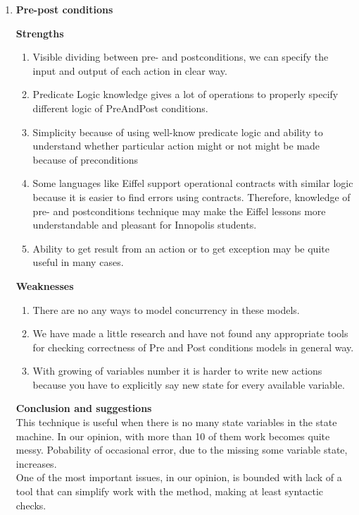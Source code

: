 \documentclass{article}
\begin{document}
\begin{enumerate}
\item \textbf{Pre-post conditions}

\textbf{Strengths}

\begin{enumerate}
\item Visible dividing between pre- and postconditions, we can specify the input and output of each action in clear way.
\item Predicate Logic knowledge gives a lot of operations to properly specify different logic of PreAndPost conditions.
\item Simplicity because of using well-know predicate logic and ability to understand whether particular action might or not might be made because of preconditions
\item Some languages like Eiffel support operational contracts with similar logic because it is easier to find errors using contracts. Therefore, knowledge of pre- and postconditions technique may make the Eiffel lessons more understandable and pleasant for Innopolis students.
\item Ability to get result from an action or to get exception may be quite useful in many cases.
\end{enumerate}

\textbf{Weaknesses}

\begin{enumerate}
\item There are no any ways to model concurrency in these models. 
\item We have made a little research and have not found any appropriate tools for checking correctness of Pre and Post conditions models in general way.
\item With growing of variables number it is harder to write new actions because you have to explicitly say new state for every available variable.
\end{enumerate}

\textbf{Conclusion and suggestions}\\
This technique is useful when there is no many state variables in the state machine. In our opinion, with more than 10 of them work becomes quite messy. Pobability of occasional error, due to the missing some variable state, increases. \\
One of the most important issues, in our opinion, is bounded with lack of a tool that can simplify work with the method, making at least syntactic checks.


\end{enumerate}
\end{document}
